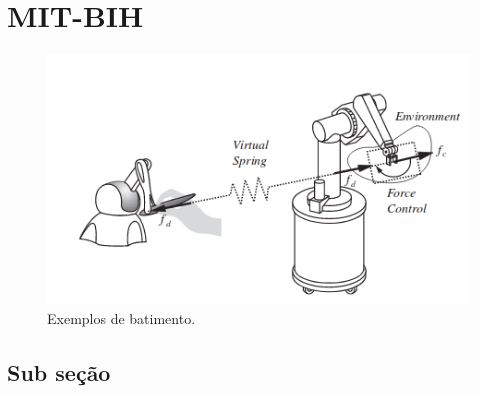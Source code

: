 \section{MIT-BIH}

\begin{figure}[htb]
    \begin{center}  
        \includegraphics[scale=0.6]{images/haptic.png}
    \end{center}
    \caption{Exemplos de batimento. }
    \label{fig_mitbih}
\end{figure}

\subsection{Sub seção}

